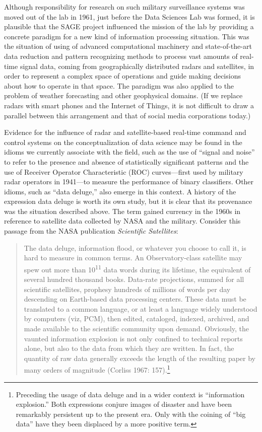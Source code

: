 \documentclass[
  letterpaper,
]{report}
\begin{document}
Although responsibility for research on such military surveillance
systems was moved out of the lab in 1961, just before the Data Sciences
Lab was formed, it is plausible that the SAGE project influenced the
mission of the lab by providing a concrete paradigm for a new kind of
information processing situation. This was the situation of using of
advanced computational machinery and state-of-the-art data reduction and
pattern recognizing methods to process vast amounts of real-time signal
data, coming from geographically distributed radars and satellites, in
order to represent a complex space of operations and guide making
decisions about how to operate in that space. The paradigm was also
applied to the problem of weather forecasting and other geophysical
domains. (If we replace radars with smart phones and the Internet of
Things, it is not difficult to draw a parallel between this arrangement
and that of social media corporations today.)

Evidence for the influence of radar and satellite-based real-time
command and control systems on the conceptualization of data science may
be found in the idioms we currently associate with the field, such as
the use of ``signal and noise'' to refer to the presence and absence of
statistically significant patterns and the use of Receiver Operator
Characteristic (ROC) curves---first used by military radar operators in
1941---to measure the performance of binary classifiers. Other idioms,
such as ``data deluge,'' also emerge in this context. A history of the
expression data deluge is worth its own study, but it is clear that its
provenance was the situation described above. The term gained currency
in the 1960s in reference to satellite data collected by NASA and the
military. Consider this passage from the NASA publication
\emph{Scientific Satellites}:

\begin{quote}
The data deluge, information flood, or whatever you choose to call it,
is hard to measure in common terms. An Observatory-class satellite may
spew out more than 10\textsuperscript{11} data words during its
lifetime, the equivalent of several hundred thousand books. Data-rate
projections, summed for all scientific satellites, prophesy hundreds of
millions of words per day descending on Earth-based data processing
centers. These data must be translated to a common language, or at least
a language widely understood by computers (viz, PCM), then edited,
cataloged, indexed, archived, and made available to the scientific
community upon demand. Obviously, the vaunted information explosion is
not only confined to technical reports alone, but also to the data from
which they are written. In fact, the quantity of raw data generally
exceeds the length of the resulting paper by many orders of magnitude
(Corliss 1967: 157).\footnote{Preceding the usage of data deluge and in
  a wider context is ``information explosion.'' Both expressions conjure
  images of disaster and have been remarkably persistent up to the
  present era. Only with the coining of ``big data'' have they been
  displaced by a more positive term.}
\end{quote}
\end{document}
